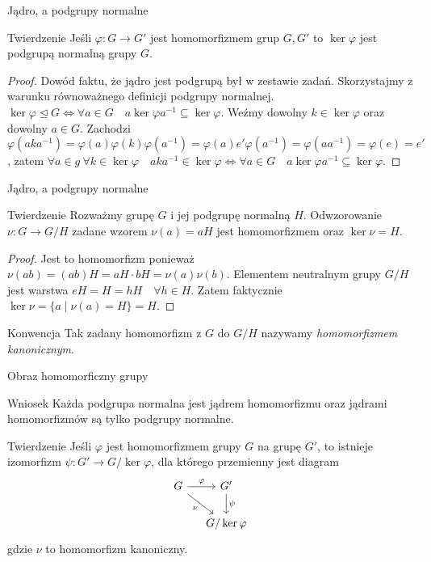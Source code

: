 \documentclass{beamer}
\let\phi\varphi
\begin{document}
\begin{frame}{Jądro, a podgrupy normalne}
    \begin{block}{Twierdzenie}
        Jeśli $\phi : G \rightarrow  G'$ jest homomorfizmem grup $G, G'$ to $\ker \phi$ jest podgrupą normalną grupy $G$.
    \end{block}
    \pause 
    \begin{proof}
        Dowód faktu, że jądro jest podgrupą był w zestawie zadań. Skorzystajmy z warunku równoważnego definicji podgrupy normalnej.
        $\ker \phi \trianglelefteq G \Leftrightarrow \forall a \in G \quad a \ker \phi a^{-1} \subseteq \ker \phi$. 
        Weźmy dowolny $k \in \ker \phi$ oraz dowolny $a \in G$. Zachodzi $\phi(aka^{-1}) = \phi(a) \phi(k) \phi(a^{-1}) = \phi(a) e' \phi(a^{-1}) = \phi(a a^{-1}) = \phi(e) = e'$, 
        zatem $\forall a \in g  \ \forall k \in \ker \phi \quad a k a^{-1} \in \ker \phi  \Leftrightarrow \forall a \in G \quad a \ker \phi a^{-1} \subseteq \ker \phi$.
    \end{proof}
\end{frame}

\begin{frame}{Jądro, a podgrupy normalne}
    \begin{block}{Twierdzenie}
        Rozważmy grupę $G$ i jej podgrupę normalną $H$. Odwzorowanie $\nu : G \rightarrow G/H$ zadane wzorem $\nu(a) = aH$
        jest homomorfizmem oraz $\ker \nu = H$.
    \end{block}
    \pause 
    \begin{proof}
        Jest to homomorfizm ponieważ $\nu(ab) = (ab)H = aH \cdot bH = \nu(a)\nu(b)$. Elementem neutralnym grupy $G/H$ jest warstwa $eH = H = hH  \quad \forall h \in H.$
        Zatem faktycznie $\ker \nu = \{ a \mid \nu(a) = H\} = H$. 
    \end{proof}    
    \pause 
    \begin{alertblock}{Konwencja}
        Tak zadany homomorfizm z $G$ do $G/H$ nazywamy \textit{homomorfizmem kanonicznym}.
    \end{alertblock}
\end{frame}

\begin{frame}{Obraz homomorficzny grupy}
    \begin{alertblock}{Wniosek}
        Każda podgrupa normalna jest jądrem homomorfizmu oraz jądrami homomorfizmów są tylko podgrupy normalne.
    \end{alertblock}
    \pause
    \begin{block}{Twierdzenie}
        Jeśli $\phi$ jest homomorfizmem grupy $G$ na grupę $G'$, to istnieje izomorfizm $\psi : G' \rightarrow G/\ker\phi$,
        dla którego przemienny jest diagram 
        $$
            \begin{tikzcd}[ampersand replacement=\&, column sep=small]
                G \arrow[r, "\phi"]  \arrow[rd, "\nu"'] \& G' \arrow[d, "\psi"] \\
                \& G / \ker \phi
            \end{tikzcd}
        $$   
        gdzie $\nu$ to homomorfizm kanoniczny.
    \end{block}
\end{frame}
\end{document}
